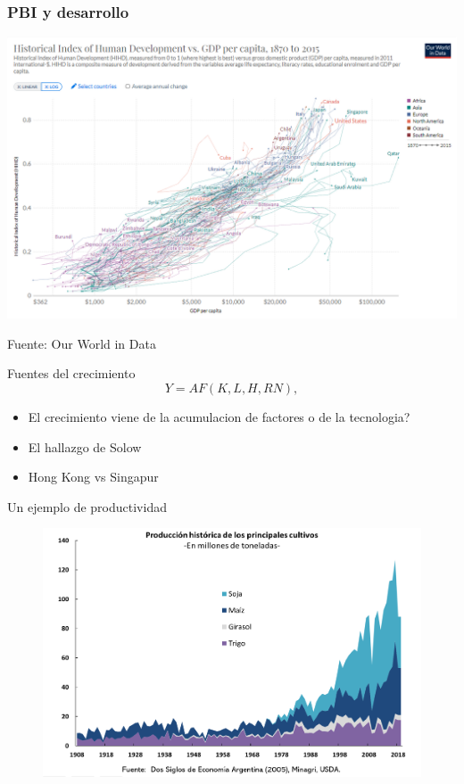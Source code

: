 \documentclass{beamer}
\begin{document}
\begin{frame}
\frametitle{PBI y desarrollo}
\begin{center}
    \href{https://ourworldindata.org/grapher/hdi-vs-gdp-per-capita} {\includegraphics[scale=0.35]{Slides Principios de Economia/Tema_11.27_hdi_2.png}}
\end{center}
Fuente: Our World in Data
\end{frame}

\begin{frame}{Fuentes del crecimiento}
   \begin{equation}
    Y = AF(K,L,H,RN),
\end{equation} 
\begin{itemize}
    \item El crecimiento viene de la acumulacion de factores o de la tecnologia?
    \item El hallazgo de Solow
    \item Hong Kong vs Singapur
\end{itemize}
\end{frame}

\begin{frame}{Un ejemplo de productividad}
    \begin{figure} [H]   \includegraphics[scale=0.55]{Slides Principios de Economia/Figures/C17.3.png}
\label{fig:17.3}
\end{figure}
\end{frame}
\end{document}
